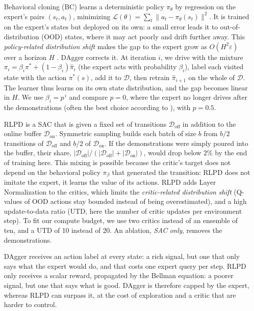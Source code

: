 \documentclass[10pt,a4paper,english]{article}
\newcommand{\D}{\mathcal{D}}
\newcommand{\piexp}{\pi^{*}}
\begin{document}
Behavioral cloning (BC) learns a deterministic policy $\pi_\theta$ by regression on the expert's pairs $(s_t, a_t)$, minimizing $\mathcal{L}(\theta) = \sum_t \|a_t - \pi_\theta(s_t)\|^2$. It is trained on the expert's states but deployed on its own: a small error leads it to out-of-distribution (OOD) states, where it may act poorly and drift further away. This \emph{policy-related distribution shift} makes the gap to the expert grow as $O(H^2\varepsilon)$ over a horizon $H$ \citep{ross2010efficient}. DAgger corrects it. At iteration $i$, we drive with the mixture $\pi_i = \beta_i \piexp + (1-\beta_i)\hat{\pi}_i$ (the expert acts with probability $\beta_i$), label each visited state with the action $\piexp(s)$, add it to $\D$, then retrain $\hat{\pi}_{i+1}$ on the whole of $\D$. The learner thus learns on its own state distribution, and the gap becomes linear in $H$. We use $\beta_i = p^{\,i}$ and compare $p = 0$, where the expert no longer drives after the demonstrations (often the best choice according to \citet{ross2011dagger}), with $p = 0.5$.

RLPD is a SAC \citep{haarnoja2018sacapps} that is given a fixed set of transitions $\D_{\text{off}}$ in addition to the online buffer $\D_{\text{on}}$. Symmetric sampling builds each batch of size $b$ from $b/2$ transitions of $\D_{\text{off}}$ and $b/2$ of $\D_{\text{on}}$. If the demonstrations were simply poured into the buffer, their share, $|\D_{\text{off}}|/(|\D_{\text{off}}|+|\D_{\text{on}}|)$, would drop below $2\%$ by the end of training here. This mixing is possible because the critic's target does not depend on the behavioral policy $\pi_\beta$ that generated the transition: RLPD does not imitate the expert, it learns the value of its actions. RLPD adds Layer Normalization to the critics, which limits the \emph{critic-related distribution shift} (Q-values of OOD actions stay bounded instead of being overestimated), and a high update-to-data ratio (UTD, here the number of critic updates per environment step). To fit our compute budget, we use two critics instead of an ensemble of ten, and a UTD of 10 instead of 20. An ablation, \emph{SAC only}, removes the demonstrations.

DAgger receives an action label at every state: a rich signal, but one that only says what the expert would do, and that costs one expert query per step. RLPD only receives a scalar reward, propagated by the Bellman equation: a poorer signal, but one that says what is good. DAgger is therefore capped by the expert, whereas RLPD can surpass it, at the cost of exploration and a critic that are harder to control.
\end{document}
